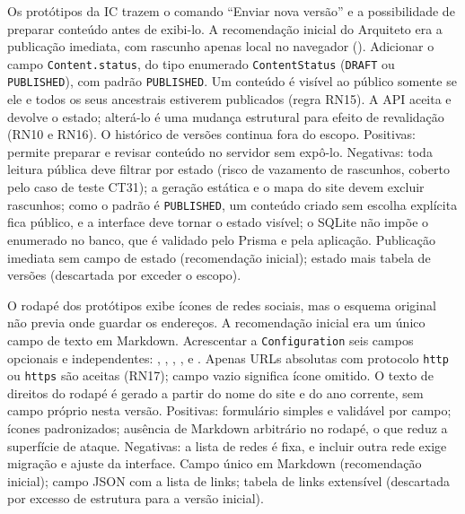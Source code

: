 {Os protótipos da IC trazem o comando ``Enviar nova versão'' e a possibilidade de preparar conteúdo antes de exibi-lo. A recomendação inicial do Arquiteto era a publicação imediata, com rascunho apenas local no navegador ().}
{Adicionar o campo \texttt{Content.status}, do tipo enumerado \texttt{ContentStatus} (\texttt{DRAFT} ou \texttt{PUBLISHED}), com padrão \texttt{PUBLISHED}. Um conteúdo é visível ao público somente se ele e todos os seus ancestrais estiverem publicados (regra RN15). A API aceita e devolve o estado; alterá-lo é uma mudança estrutural para efeito de revalidação (RN10 e RN16). O histórico de versões continua fora do escopo.}
{Positivas: permite preparar e revisar conteúdo no servidor sem expô-lo. Negativas: toda leitura pública deve filtrar por estado (risco de vazamento de rascunhos, coberto pelo caso de teste CT31); a geração estática e o mapa do site devem excluir rascunhos; como o padrão é \texttt{PUBLISHED}, um conteúdo criado sem escolha explícita fica público, e a interface deve tornar o estado visível; o SQLite não impõe o enumerado no banco, que é validado pelo Prisma e pela aplicação.}
{Publicação imediata sem campo de estado (recomendação inicial); estado mais tabela de versões (descartada por exceder o escopo).}

{O rodapé dos protótipos exibe ícones de redes sociais, mas o esquema original não previa onde guardar os endereços. A recomendação inicial era um único campo de texto em Markdown.}
{Acrescentar a \texttt{Configuration} seis campos opcionais e independentes: , , , ,  e . Apenas URLs absolutas com protocolo \texttt{http} ou \texttt{https} são aceitas (RN17); campo vazio significa ícone omitido. O texto de direitos do rodapé é gerado a partir do nome do site e do ano corrente, sem campo próprio nesta versão.}
{Positivas: formulário simples e validável por campo; ícones padronizados; ausência de Markdown arbitrário no rodapé, o que reduz a superfície de ataque. Negativas: a lista de redes é fixa, e incluir outra rede exige migração e ajuste da interface.}
{Campo único em Markdown (recomendação inicial); campo JSON com a lista de links; tabela de links extensível (descartada por excesso de estrutura para a versão inicial).}

